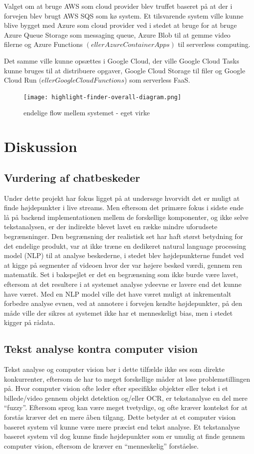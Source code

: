 \documentclass{article}
\begin{document}
Valget om at bruge AWS som cloud provider blev truffet baseret på at der i forvejen blev brugt AWS SQS som kø system. Et tilsvarende system ville kunne blive bygget med Azure som cloud provider ved i stedet at bruge for at bruge Azure Queue Storage som messaging queue, Azure Blob til at gemme video filerne og Azure Functions \((eller Azure Container Apps)\) til serverless computing.

Det samme ville kunne opsættes i Google Cloud, der ville Google Cloud Tasks kunne bruges til at distribuere opgaver, Google Cloud Storage til filer og Google Cloud Run \((eller Google Cloud Functions\)) som serverless FaaS.
\begin{figure}[!ht]
\centering
\texttt{[image: highlight-finder-overall-diagram.png]}
\caption{endelige flow mellem systemet - eget virke}
\end{figure}


\section{Diskussion}


\subsection{Vurdering af chatbeskeder}
Under dette projekt har fokus ligget på at undersøge hvorvidt det er muligt at finde højdepunkter i live streams. Men eftersom det primære fokus i sidste ende lå på backend implementationen mellem de forskellige komponenter, og ikke selve tekstanalysen, er der indirekte blevet lavet en række mindre uforudsete begrænsninger. Den begrænsning der realistisk set har haft størst betydning for det endelige produkt, var at ikke træne en dedikeret natural language processing model (NLP) til at analyse beskederne, i stedet blev højdepunkterne fundet ved at kigge på segmenter af videoen hvor der var højere besked værdi, gennem ren matematik. Set i bakspejlet er det en begrænsning som ikke burde være lavet, eftersom at det resultere i at systemet analyse ydeevne er lavere end det kunne have været. Med en NLP model ville det have været muligt at inkrementalt forbedre analyse evnen, ved at annotere i forvejen kendte højdepunkter, på den måde ville der sikres at systemet ikke har et menneskeligt bias, men i stedet kigger på rådata.

\subsection{Tekst analyse kontra computer vision  }
Tekst analyse og computer vision bør i dette tilfælde ikke ses som direkte konkurrenter, eftersom de har to meget forskellige måder at løse problemstillingen på. Hvor computer vision ofte leder efter specifikke objekter eller tekst i et billede/video gennem objekt detektion og/eller OCR, er tekstanalyse en del mere “fuzzy”. Eftersom sprog kan være meget tvetydige, og ofte kræver kontekst for at forstås kræver det en mere åben tilgang. Dette betyder at et computer vision baseret system vil kunne være mere præcist end tekst analyse. Et tekstanalyse baseret system vil dog kunne finde højdepunkter som er umulig at finde gennem computer vision, eftersom de kræver en “menneskelig” forståelse.
\end{document}
